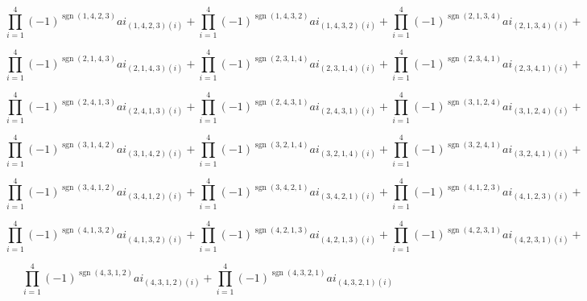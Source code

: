 \documentclass[12pt]{article}
\begin{document}
    $$\prod_{i=1}^{4} (-1)^ {\operatorname{sgn}(1, 4, 2, 3)}  ai_{(1, 4, 2, 3) (i)} + 
    \prod_{i=1}^{4} (-1)^ {\operatorname{sgn}(1, 4, 3, 2)}  ai_{(1, 4, 3, 2) (i)} + 
    \prod_{i=1}^{4} (-1)^ {\operatorname{sgn}(2, 1, 3, 4)}  ai_{(2, 1, 3, 4) (i)} + $$
    
    $$\prod_{i=1}^{4} (-1)^ {\operatorname{sgn}(2, 1, 4, 3)}  ai_{(2, 1, 4, 3) (i)} + 
    \prod_{i=1}^{4} (-1)^ {\operatorname{sgn}(2, 3, 1, 4)}  ai_{(2, 3, 1, 4) (i)} + 
    \prod_{i=1}^{4} (-1)^ {\operatorname{sgn}(2, 3, 4, 1)}  ai_{(2, 3, 4, 1) (i)} + $$
    
    $$\prod_{i=1}^{4} (-1)^ {\operatorname{sgn}(2, 4, 1, 3)}  ai_{(2, 4, 1, 3) (i)} + 
    \prod_{i=1}^{4} (-1)^ {\operatorname{sgn}(2, 4, 3, 1)}  ai_{(2, 4, 3, 1) (i)} + 
    \prod_{i=1}^{4} (-1)^ {\operatorname{sgn}(3, 1, 2, 4)}  ai_{(3, 1, 2, 4) (i)} + $$
    
    $$\prod_{i=1}^{4} (-1)^ {\operatorname{sgn}(3, 1, 4, 2)}  ai_{(3, 1, 4, 2) (i)} + 
    \prod_{i=1}^{4} (-1)^ {\operatorname{sgn}(3, 2, 1, 4)}  ai_{(3, 2, 1, 4) (i)} + 
    \prod_{i=1}^{4} (-1)^ {\operatorname{sgn}(3, 2, 4, 1)}  ai_{(3, 2, 4, 1) (i)} + $$
    
    $$\prod_{i=1}^{4} (-1)^ {\operatorname{sgn}(3, 4, 1, 2)}  ai_{(3, 4, 1, 2) (i)} + 
    \prod_{i=1}^{4} (-1)^ {\operatorname{sgn}(3, 4, 2, 1)}  ai_{(3, 4, 2, 1) (i)} + 
    \prod_{i=1}^{4} (-1)^ {\operatorname{sgn}(4, 1, 2, 3)}  ai_{(4, 1, 2, 3) (i)} + $$
    
    $$\prod_{i=1}^{4} (-1)^ {\operatorname{sgn}(4, 1, 3, 2)}  ai_{(4, 1, 3, 2) (i)} + 
    \prod_{i=1}^{4} (-1)^ {\operatorname{sgn}(4, 2, 1, 3)}  ai_{(4, 2, 1, 3) (i)} + 
    \prod_{i=1}^{4} (-1)^ {\operatorname{sgn}(4, 2, 3, 1)}  ai_{(4, 2, 3, 1) (i)} + $$
    
    $$\prod_{i=1}^{4} (-1)^ {\operatorname{sgn}(4, 3, 1, 2)}  ai_{(4, 3, 1, 2) (i)} + 
    \prod_{i=1}^{4} (-1)^ {\operatorname{sgn}(4, 3, 2, 1)}  ai_{(4, 3, 2, 1) (i)} $$

\newpage


\end{document}

